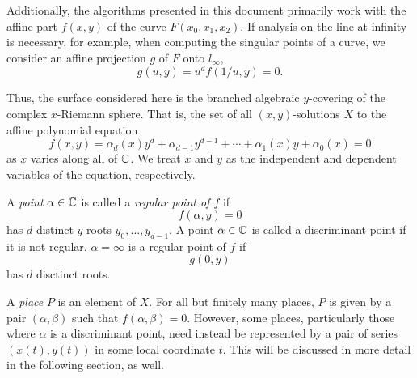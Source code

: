 Additionally, the algorithms presented in this document primarily work
with the affine part $f(x,y)$ of the curve $F(x_0,x_1,x_2)$. If analysis
on the line at infinity is necessary, for example, when computing the
singular points of a curve, we consider an affine projection $g$ of $F$
onto $l_\infty$,
\[
    g(u,y) = u^d f(1/u,y) = 0.
\]

Thus, the surface considered here is the branched algebraic $y$-covering
of the complex $x$-Riemann sphere. That is, the set of all
$(x,y)$-solutions $X$ to the affine polynomial equation
\[
    f(x,y) = \alpha_d(x)y^d + \alpha_{d-1}y^{d-1} + \cdots +
             \alpha_1(x)y + \alpha_0(x) = 0
\]
as $x$ varies along all of $\operatorname{\mathbb{C}}$. We treat $x$ and $y$ as the
independent and dependent variables of the equation, respectively.

A {\it point} $\alpha \in \operatorname{\mathbb{C}}$ is called a {\it regular point of $f$} if
\[
    f(\alpha,y) = 0
\]
has $d$ distinct $y$-roots $y_0,\ldots,y_{d-1}$. A point $\alpha \in
\operatorname{\mathbb{C}}$ is called a discriminant point if it is not regular. $\alpha =
\infty$ is a regular point of $f$ if
\[
    g(0,y)
\]
has $d$ disctinct roots.

A {\it place} $P$ is an element of $X$. For all but finitely many
places, $P$ is given by a pair $(\alpha,\beta)$ such that
$f(\alpha,\beta) = 0$. However, some places, particularly those where
$\alpha$ is a discriminant point, need instead be represented by a pair
of series $(x(t),y(t))$ in some local coordinate $t$. This will be
discussed in more detail in the following section, as well.
